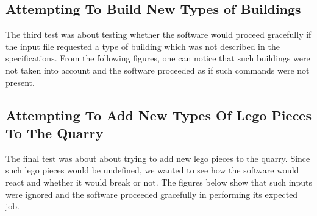 \documentclass[12pt, A4]{report}
\begin{document}
		\subsection*{Attempting To Build New Types of Buildings}
		The third test was about testing whether the software would proceed gracefully if the input file requested a type of building which was not described in the specifications. From the following figures, one can notice that such buildings were not taken into account and the software proceeded as if such commands were not present.

			\begin{figure}[h]
				\centering	
				\qquad
			\end{figure}

		\subsection*{Attempting To Add New Types Of Lego Pieces To The Quarry}
		The final test was about about trying to add new lego pieces to the quarry. Since such lego pieces would be undefined, we wanted to see how the software would react and whether it would break or not. The figures below show that such inputs were ignored and the software proceeded gracefully in performing its expected job.

			\begin{figure}[h]
				\centering	
				\qquad
			\end{figure}
\end{document}
